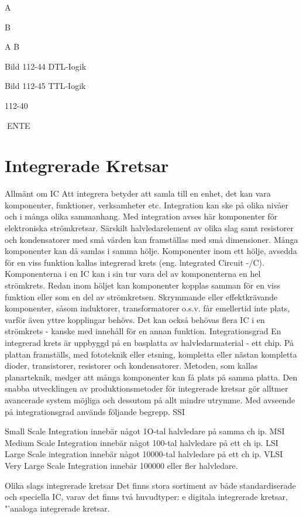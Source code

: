 {{A

B

A
B

Bild 112-44 DTL-Iogik

Bild 112-45 TTL-Iogik

112-40

ENTE
\section{Integrerade Kretsar}
Allmänt om IC
Att integrera betyder att samla till en enhet,
det kan vara komponenter, funktioner, verksamheter etc. Integration kan ske på olika
nivåer och i många olika sammanhang.
Med integration avses här komponenter
för elektroniska strömkretsar. Särskilt halvledarelement av olika slag samt resistorer
och kondensatorer med små värden kan
framställas med små dimensioner. Många
komponenter kan då samlas i samma hölje.
Komponenter inom ett hölje, avsedda för
en viss funktion kallas integrerad krets (eng.
lntegrated Circuit -/C).
Komponenterna i en IC kan i sin tur vara
del av komponenterna en hel strömkrets.
Redan inom höljet kan komponenter kopplas samman för en viss funktion eller som en
del av strömkretsen. Skrymmande eller effektkrävande komponenter, såsom induktorer, transformatorer o.s.v. får emellertid inte
plats, varför även yttre kopplingar behövs.
Det kan också behövas flera IC i en strömkrets - kanske med innehåll för en annan
funktion.
Integrationsgrad
En integrerad krets är uppbyggd på en basplatta av halvledarmaterial - ett chip. På
plattan framställs, med fototeknik eller etsning, kompletta eller nästan kompletta dioder, transistorer, resistorer och kondensatorer. Metoden, som kallas planarteknik, medger att många komponenter kan få plats på
samma platta.
Den snabba utvecklingen av produktionsmetoder för integrerade kretsar gör alltmer
avancerade system möjliga och dessutom
på allt mindre utrymme. Med avseende på
integrationsgrad används följande begrepp.
SSI

Small Scale Integration innebär något
1O-tal halvledare på samma ch ip.
MSI Medium Scale Integration innebär
något 100-tal halvledare på ett ch ip.
LSI Large Scale integration innebär något
10000-tal halvledare på ett ch ip.
VLSI Very Large Scale Integration innebär
100000 eller fler halvledare.

Olika slags integrerade kretsar
Det finns stora sortiment av både standardiserade och speciella IC, varav det finns två
huvudtyper:
e digitala integrerade kretsar,
"'analoga integrerade kretsar.

}}
